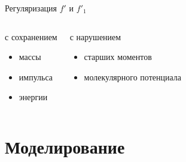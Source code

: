 \documentclass[ucs]{beamer}
\begin{document}
\begin{frame}
\begin{columns}
\begin{column}{6cm}
\begin{center}
\begin{tikzpicture}[every node/.style={circle,draw=blue!50,fill=blue!20,thick,inner sep=0pt,minimum size=8mm}, >=latex',thick, node distance=.5]
			\end{tikzpicture}
			\end{center}
		\end{column}
	\end{columns}
	\pause[3]
	\bigskip\centering \alert{Регуляризация \(f'\) и \(f'_1\)}
	\begin{columns}
		\begin{block}{\centering с сохранением}
			\begin{itemize}
				\item массы \\
				\item импульса \\
				\item энергии \\
			\end{itemize}
		\end{block}
		\begin{block}{\centering с нарушением}
			\begin{itemize}
				\item старших моментов \\
				\item молекулярного потенциала \\
			\end{itemize}
		\end{block}
	\end{columns}

\end{frame}

\section{Моделирование}
\end{document}
